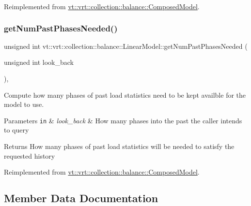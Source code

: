 Reimplemented from \hyperlink{classvt_1_1vrt_1_1collection_1_1balance_1_1_composed_model_a6399ff123f439ebb4d4e51cc71ca4883}{vt\+::vrt\+::collection\+::balance\+::\+Composed\+Model}.

\mbox{\label{structvt_1_1vrt_1_1collection_1_1balance_1_1_linear_model_a454177a512bbb73e246d3a7ad823c8e4}} 
\subsubsection{\texorpdfstring{get\+Num\+Past\+Phases\+Needed()}{getNumPastPhasesNeeded()}}
{\footnotesize\ttfamily unsigned int vt\+::vrt\+::collection\+::balance\+::\+Linear\+Model\+::get\+Num\+Past\+Phases\+Needed (\begin{DoxyParamCaption}\item[{unsigned int}]{look\+\_\+back }\end{DoxyParamCaption})\hspace{0.3cm}{\ttfamily [override]}, {\ttfamily [virtual]}}



Compute how many phases of past load statistics need to be kept availble for the model to use. 


\begin{DoxyParams}[1]{Parameters}
\mbox{\tt in}  & {\em look\+\_\+back} & How many phases into the past the caller intends to query\\
\hline
\end{DoxyParams}
\begin{DoxyReturn}{Returns}
How many phases of past load statistics will be needed to satisfy the requested history 
\end{DoxyReturn}


Reimplemented from \hyperlink{classvt_1_1vrt_1_1collection_1_1balance_1_1_composed_model_abf2a02ff624e66c7076bfe3dce961981}{vt\+::vrt\+::collection\+::balance\+::\+Composed\+Model}.



\subsection{Member Data Documentation}
\mbox{\label{structvt_1_1vrt_1_1collection_1_1balance_1_1_linear_model_a5735a20dfd17fb2804a1b9b90d5649d1}} 
